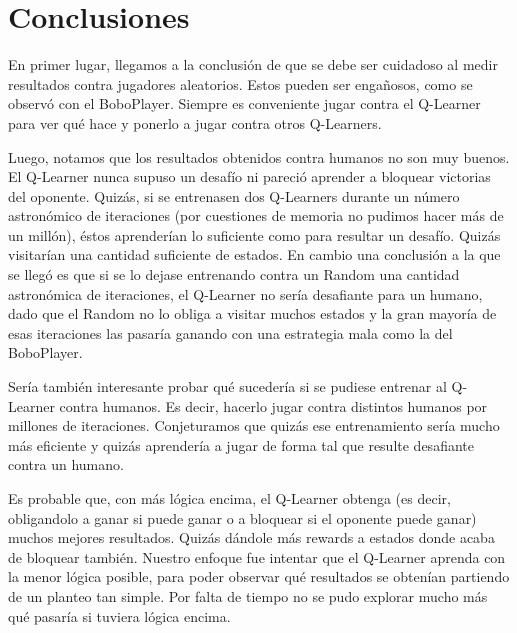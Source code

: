 \section{Conclusiones}

En primer lugar, llegamos a la conclusión de que se debe ser cuidadoso al medir resultados contra jugadores aleatorios. Estos pueden ser engañosos, como se observó con el BoboPlayer. Siempre es conveniente jugar contra el Q-Learner para ver qué hace y ponerlo a jugar contra otros Q-Learners.

Luego, notamos que los resultados obtenidos contra humanos no son muy buenos. El Q-Learner nunca supuso un desafío ni pareció aprender a bloquear victorias del oponente. Quizás, si se entrenasen dos Q-Learners durante un número astronómico de iteraciones (por cuestiones de memoria no pudimos hacer más de un millón), éstos aprenderían lo suficiente como para resultar un desafío. Quizás visitarían una cantidad suficiente de estados. En cambio una conclusión a la que se llegó es que si se lo dejase entrenando contra un Random una cantidad astronómica de iteraciones, el Q-Learner no sería desafiante para un humano, dado que el Random no lo obliga a visitar muchos estados y la gran mayoría de esas iteraciones las pasaría ganando con una estrategia mala como la del BoboPlayer.

Sería también interesante probar qué sucedería si se pudiese entrenar al Q-Learner contra humanos. Es decir, hacerlo jugar contra distintos humanos por millones de iteraciones. Conjeturamos que quizás ese entrenamiento sería mucho más eficiente y quizás aprendería a jugar de forma tal que resulte desafiante contra un humano.

Es probable que, con más lógica encima, el Q-Learner obtenga (es decir, obligandolo a ganar si puede ganar o a bloquear si el oponente puede ganar) muchos mejores resultados. Quizás dándole más rewards a estados donde acaba de bloquear también. Nuestro enfoque fue intentar que el Q-Learner aprenda con la menor lógica posible, para poder observar qué resultados se obtenían partiendo de un planteo tan simple. Por falta de tiempo no se pudo explorar mucho más qué pasaría si tuviera lógica encima.
